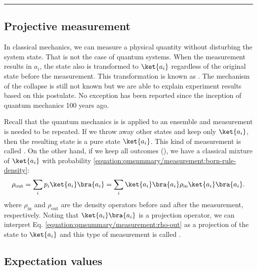 \documentclass[letterpaper,10pt,english]{jupyterBook}
\begin{document}
\bigskip\hrule\bigskip



\subsection{Projective measurement}
\label{\detokenize{qmsummary/measurement:projective-measurement}}
\sphinxAtStartPar
In classical mechanics, we can measure a physical quantity without disturbing the system state.  That is not the case of quantum systems.  When  the measurement results in \(a_i\), the state also is transformed to \(\ket{a_i}\) regardless of the original state before the measurement.  This transformation is known as .  The mechanism of the collapse is still not known but we are able to explain experiment results based on this postulate.  No exception has been reported since the inception of quantum mechanics 100 years ago.

\sphinxAtStartPar
Recall that the quantum mechanics is is applied to an ensemble and measurement is needed to be repeated.  If we throw away other states and keep only \(\ket{a_i}\), then the resulting state is a pure state \(\ket{a_i}\).  This kind of measurement is called .   On the other hand, if we keep all outcomes (), we have a classical mixture of \(\ket{a_i}\) with probability \eqref{equation:qmsummary/measurement:born-rule-density}:
\begin{equation}\label{equation:qmsummary/measurement:rho-out}
\begin{split}
\rho_\text{out} = \sum_i p_i \ket{a_i}\bra{a_i}  = \sum_i \ket{a_i}\bra{a_i} \rho_\text{in} \ket{a_i}\bra{a_i}.
\end{split}
\end{equation}
\sphinxAtStartPar
where \(\rho_\text{in}\) and \(\rho_\text{out}\) are the density operators before and after the measurement, respectively.   Noting that \(\ket{a_i}\bra{a_i}\) is a projection operator, we can interpret Eq. \eqref{equation:qmsummary/measurement:rho-out} as a projection of the state to \(\ket{a_i}\) and this type of measurement is called .


\subsection{Expectation values}
\label{\detokenize{qmsummary/measurement:expectation-values}}
\end{document}
